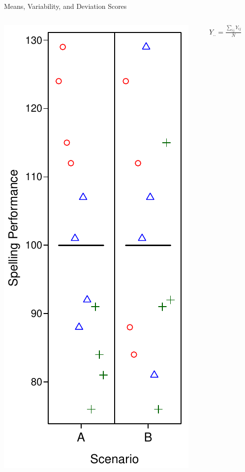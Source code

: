\documentclass[presentation]{beamer}
\begin{document}
\begin{frame}[label={sec:org7555801}]{Means, Variability, and Deviation Scores}
\begin{columns}
\begin{column}{.3\columnwidth}
\includegraphics[width=.9\linewidth]{08_glm_img/spelling-01.pdf}
\end{column}

\begin{column}{.7\columnwidth}
\(Y_{..} = \frac{\sum_{ij} Y_{ij}}{N}\)
\end{column}
\end{columns}
\end{frame}
\end{document}
